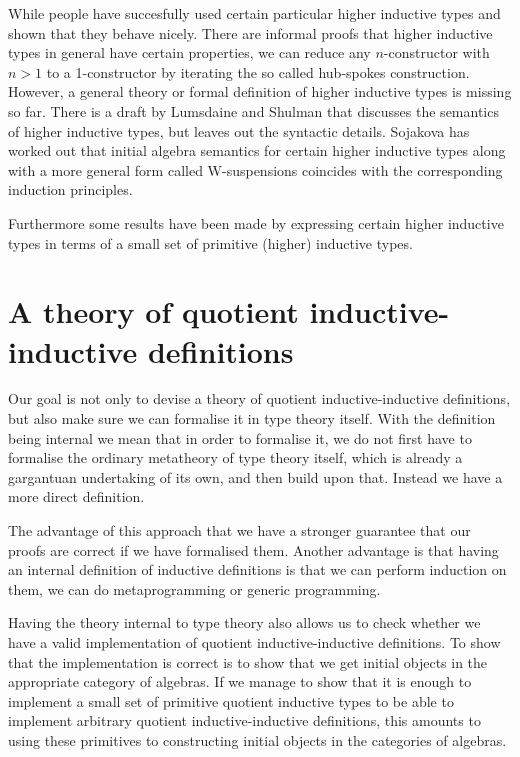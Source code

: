 While people have succesfully used certain particular higher inductive
types and shown that they behave nicely. There are informal proofs
that higher inductive types in general have certain properties, \eg we
can reduce any $n$-constructor with $n > 1$ to a 1-constructor by
iterating the so called hub-spokes construction. However, a general
theory or formal definition of higher inductive types is missing so
far. There is a draft by Lumsdaine and Shulman that discusses the
semantics of higher inductive types, but leaves out the syntactic
details. Sojakova has worked out that initial algebra semantics for
certain higher inductive types along with a more general form called
W-suspensions coincides with the corresponding induction principles.

Furthermore some results have been made by expressing certain higher
inductive types in terms of a small set of primitive (higher)
inductive types.


\section{A theory of quotient inductive-inductive definitions}

Our goal is not only to devise a theory of quotient
inductive-inductive definitions, but also make sure we can formalise
it in type theory itself. With the definition being internal we mean
that in order to formalise it, we do not first have to formalise the
ordinary metatheory of type theory itself, which is already a
gargantuan undertaking of its own, and then build upon that. Instead
we have a more direct definition.


The advantage of this approach that we have a stronger guarantee that
our proofs are correct if we have formalised them. Another advantage
is that having an internal definition of inductive definitions is that
we can perform induction on them, \ie we can do metaprogramming or
generic programming.

Having the theory internal to type theory also allows us to check
whether we have a valid implementation of quotient inductive-inductive
definitions. To show that the implementation is correct is to show
that we get initial objects in the appropriate category of
algebras. If we manage to show that it is enough to implement a small
set of primitive quotient inductive types to be able to implement
arbitrary quotient inductive-inductive definitions, this amounts to
using these primitives to constructing initial objects in the
categories of algebras.

